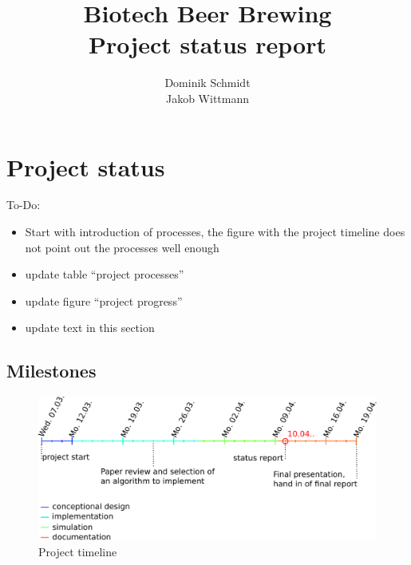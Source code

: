 \documentclass[a4paper,10pt]{article}
\title{Biotech Beer Brewing\\Project status report}
\author{Dominik Schmidt\\Jakob Wittmann}
\begin{document}
\maketitle


\section{Project status}

To-Do:
\begin{itemize}
 \item Start with introduction of processes, the figure with the project timeline does not point out the processes well enough
 \item update table ``project processes''
 \item update figure ``project progress''
 \item update text in this section
\end{itemize}


\subsection{Milestones}

\begin{figure}[h]
 \centering
 \includegraphics[width=\linewidth]{timeline.pdf}
 \caption{Project timeline}
 \label{fig:project_timeline}
\end{figure}
\end{document}
